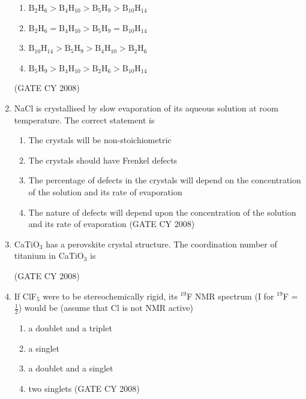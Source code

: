 \documentclass[12pt]{article}
\begin{document}
\begin{enumerate}
\begin{enumerate}
    \item $\mathrm{B_2H_6 > B_4H_{10} > B_5H_9 > B_{10}H_{14}}$
    \item $\mathrm{B_2H_6 = B_4H_{10} > B_5H_9 = B_{10}H_{14}}$
    \item $\mathrm{B_{10}H_{14} > B_5H_9 > B_4H_{10} > B_2H_6}$
    \item $\mathrm{B_5H_9 > B_4H_{10} > B_2H_6 > B_{10}H_{14}}$
\end{enumerate}  \hfill{(GATE CY 2008)}


\item NaCl is crystallised by slow evaporation of its aqueous solution at room temperature. The correct statement is
\begin{enumerate}
\item  The crystals will be non-stoichiometric
\item  The crystals should have Frenkel defects
\item  The percentage of defects in the crystals will depend on the concentration of the solution and its rate of evaporation
\item  The nature of defects will depend upon the concentration of the solution and its rate of evaporation    \hfill{(GATE CY 2008)}
\end{enumerate}


\item CaTiO$_3$ has a perovskite crystal structure. The coordination number of titanium in CaTiO$_3$ is
\begin{enumerate}
 \hfill{(GATE CY 2008)}
\end{enumerate}



\item If ClF$_5$ were to be stereochemically rigid, its $^{19}$F NMR spectrum (I for $^{19}$F = $\frac{1}{2}$) would be (assume that Cl is not NMR active)
\begin{enumerate}
\item a doublet and a triplet
\item a singlet
\item  a doublet and a singlet
\item two singlets    \hfill{(GATE CY 2008)}
\end{enumerate}



\end{enumerate}
\end{document}
